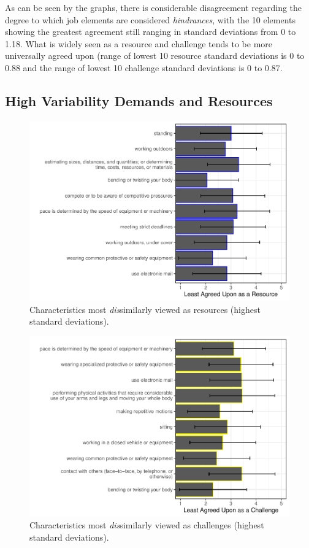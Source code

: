 \documentclass[
  english,
  man]{apa6}
\begin{document}
As can be seen by the graphs, there is considerable disagreement regarding the degree to which job elements are considered \emph{hindrances}, with the 10 elements showing the greatest agreement still ranging in standard deviations from 0 to 1.18. What is widely seen as a resource and challenge tends to be more universally agreed upon (range of lowest 10 resource standard deviations is 0 to 0.88 and the range of lowest 10 challenge standard deviations is 0 to 0.87.

\hypertarget{high-variability-demands-and-resources}{%
\subsection{High Variability Demands and Resources}\label{high-variability-demands-and-resources}}

\begin{figure}
\centering
\includegraphics{Submission_files/figure-latex/resourcesdisagree-1.pdf}
\caption{\label{fig:resourcesdisagree}Characteristics most \emph{dis}similarly viewed as resources (highest standard deviations).}
\end{figure}

\begin{figure}
\centering
\includegraphics{Submission_files/figure-latex/challengesdisagree-1.pdf}
\caption{\label{fig:challengesdisagree}Characteristics most \emph{dis}similarly viewed as challenges (highest standard deviations).}
\end{figure}
\end{document}

